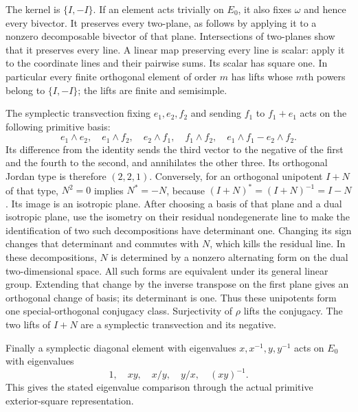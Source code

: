 The kernel is $\{I,-I\}$. If an element acts trivially on
$E_0$, it also fixes $\omega$ and hence every bivector.
It preserves every two-plane, as follows by applying it to a
nonzero decomposable bivector of that plane. Intersections of
two-planes show that it preserves every line. A linear map
preserving every line is scalar: apply it to the coordinate lines
and their pairwise sums. Its scalar has square one. In particular
every finite orthogonal element of order $m$ has lifts whose
$m$th powers belong to $\{I,-I\}$; the lifts are finite and
semisimple.

The symplectic transvection fixing $e_1,e_2,f_2$ and sending
$f_1$ to $f_1+e_1$ acts on the following primitive basis:
\[
 e_1\wedge e_2,\quad e_1\wedge f_2,\quad
 e_2\wedge f_1,\quad f_1\wedge f_2,\quad
 e_1\wedge f_1-e_2\wedge f_2.
\]
Its difference from the identity sends the third vector to
the negative of the first and the fourth to the second, and
annihilates the other three. Its orthogonal Jordan type is
therefore $(2,2,1)$. Conversely, for an orthogonal unipotent
$I+N$ of that type, $N^2=0$ implies $N^*=-N$, because
$(I+N)^*=(I+N)^{-1}=I-N$. Its image is an isotropic plane.
After choosing a basis of that plane and a dual isotropic
plane, use the isometry on their residual nondegenerate line
to make the identification of two such decompositions have
determinant one. Changing its sign changes that determinant
and commutes with $N$, which kills the residual line.
In these decompositions, $N$ is determined by a nonzero alternating form on
the dual two-dimensional space. All such forms are equivalent
under its general linear group. Extending that change by the
inverse transpose on the first plane gives an orthogonal
change of basis; its determinant is one. Thus these unipotents
form one special-orthogonal conjugacy class. Surjectivity of
$\rho$ lifts the conjugacy. The two lifts of $I+N$ are a
symplectic transvection and its negative. 

Finally a symplectic diagonal element with eigenvalues
$x,x^{-1},y,y^{-1}$ acts on $E_0$ with eigenvalues
\[
 1,\quad xy,\quad x/y,\quad y/x,\quad (xy)^{-1}.
\]
This gives the stated eigenvalue comparison through the actual
primitive exterior-square representation.

